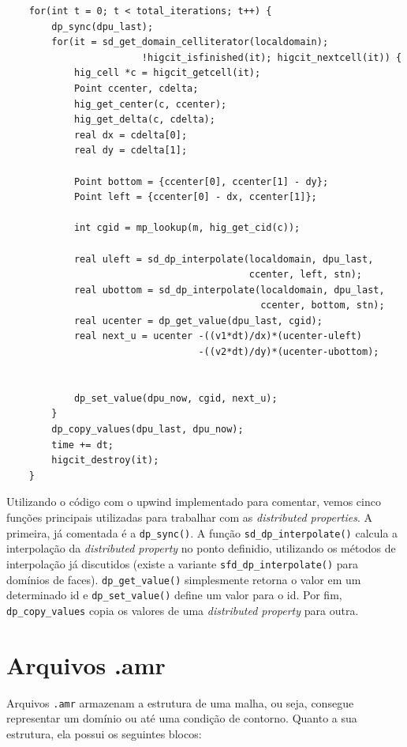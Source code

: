 \begin{verbatim}    
    for(int t = 0; t < total_iterations; t++) {
        dp_sync(dpu_last);
        for(it = sd_get_domain_celliterator(localdomain); 
                        !higcit_isfinished(it); higcit_nextcell(it)) {
            hig_cell *c = higcit_getcell(it);
            Point ccenter, cdelta;
            hig_get_center(c, ccenter);
            hig_get_delta(c, cdelta);
            real dx = cdelta[0];
            real dy = cdelta[1];

            Point bottom = {ccenter[0], ccenter[1] - dy};
            Point left = {ccenter[0] - dx, ccenter[1]};

            int cgid = mp_lookup(m, hig_get_cid(c));

            real uleft = sd_dp_interpolate(localdomain, dpu_last, 
                                           ccenter, left, stn);
            real ubottom = sd_dp_interpolate(localdomain, dpu_last, 
                                             ccenter, bottom, stn);
            real ucenter = dp_get_value(dpu_last, cgid);
            real next_u = ucenter -((v1*dt)/dx)*(ucenter-uleft) 
                                  -((v2*dt)/dy)*(ucenter-ubottom);

            
            dp_set_value(dpu_now, cgid, next_u);
        }
        dp_copy_values(dpu_last, dpu_now);
        time += dt;
        higcit_destroy(it);
    }
\end{verbatim}

Utilizando o código com o upwind implementado para comentar, vemos cinco funções principais utilizadas para trabalhar com as \textit{distributed properties}. A primeira, já comentada é a \texttt{dp\_sync()}. A função \texttt{sd\_dp\_interpolate()} calcula a interpolação da \textit{distributed property} no ponto definidio, utilizando os métodos de interpolação já discutidos (existe a variante \texttt{sfd\_dp\_interpolate()} para domínios de faces). \texttt{dp\_get\_value()} simplesmente retorna o valor em um determinado id e \texttt{dp\_set\_value()} define um valor para o id. Por fim, \texttt{dp\_copy\_values} copia os valores de uma \textit{distributed property} para outra.


\section{Arquivos .amr}
\label{sec:amr}
Arquivos \texttt{.amr} armazenam a estrutura de uma malha, ou seja, consegue representar um domínio ou até uma condição de contorno. Quanto a sua estrutura, ela possui os seguintes blocos:

